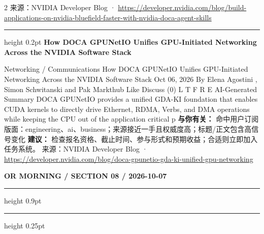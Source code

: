 \documentclass[10.5pt]{ctexart}
\begin{document}
\begin{multicols}{2}
{\footnotesize\color{ormuted} 来源：NVIDIA Developer Blog · \url{https://developer.nvidia.com/blog/build-applications-on-nvidia-bluefield-faster-with-nvidia-doca-agent-skills}}
\vspace{2mm}
\hrule height 0.2pt
\vspace{2mm}
{\large\bfseries How DOCA GPUNetIO Unifies GPU-Initiated Networking Across the NVIDIA Software Stack}\par
Networking / Communications How DOCA GPUNetIO Unifies GPU-Initiated Networking Across the NVIDIA Software Stack Oct 06, 2026 By Elena Agostini , Simon Schwitanski and Pak Markthub Like Discuss (0) L T F R E AI-Generated Summary DOCA GPUNetIO provides a unified GDA-KI foundation that enables CUDA kernels to directly drive Ethernet, RDMA, Verbs, and DMA operations while keeping the CPU out of the application critical p
\textbf{与你有关：} 命中用户订阅版面：engineering、ai、business；来源接近一手且权威度高；标题/正文包含高信号变化
\textbf{建议：} 检查报名资格、截止时间、参与形式和预期收益；合适则立即加入任务系统。
{\footnotesize\color{ormuted} 来源：NVIDIA Developer Blog · \url{https://developer.nvidia.com/blog/doca-gpunetio-gda-ki-unified-gpu-networking}}
\end{multicols}
\newpage
{\small\bfseries OR MORNING / SECTION 08 / 2026-10-07}
\vspace{2mm}
\hrule height 0.9pt
\vspace{1.5mm}
\hrule height 0.25pt
\vspace{4mm}
\end{document}
